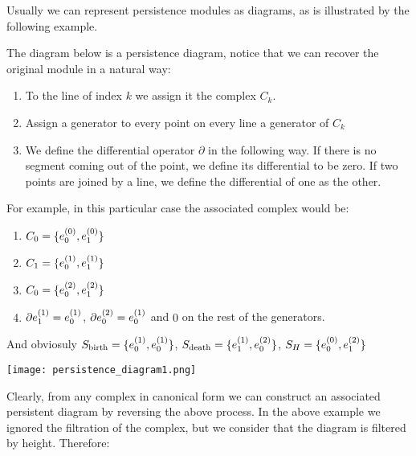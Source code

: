 Usually we can represent persistence modules as diagrams,
as is illustrated by the following example.

\begin{example}
The diagram below is a persistence diagram, notice that we can recover the original module in a natural 
way:

\begin{enumerate}


\item To the line of index $k$ we assign
it the complex $C_k$.

\item Assign a generator to every point on every line a generator of $C_k$

\item We define the differential operator $\partial$
in the following way. If there is no segment coming out of the point, we define its differential to be zero.
If two points are joined by a line, we define the differential of one as the other.

\end{enumerate}

For example, in this particular case the associated complex would be:

\begin{enumerate}

\item $C_0 = \{e_{0}^{(0)},e_{1}^{(0)}\}$

\item $C_1 = \{e_{0}^{(1)},e_{1}^{(1)}\}$

\item $C_0 = \{e_{0}^{(2)},e_{1}^{(2)}\}$

\item $\partial e_{1}^{(1)}=e_{0}^{(1)}$, $\partial e_{0}^{(2)}=e_{0}^{(1)}$ and 
$0$ on the rest of the generators.
\end{enumerate}

And obviosuly $S_{\text{birth}}=\{
e_{0}^{(1)},
e_{0}^{(1)}
\}$,
$S_{\text{death}}=\{
e_{1}^{(1)},
e_{0}^{(2)}
\}$,
$
S_H=\{
e_{0}^{(0)},
e_{1}^{(2)}
\}
$

\end{example}

\begin{center}
\texttt{[image: persistence\_diagram1.png]}
\end{center}


Clearly, from any complex in canonical form we can construct an associated persistent diagram by reversing the above process.
In the above example we ignored the filtration of the complex, but we consider that the diagram is filtered by height.
 Therefore:

